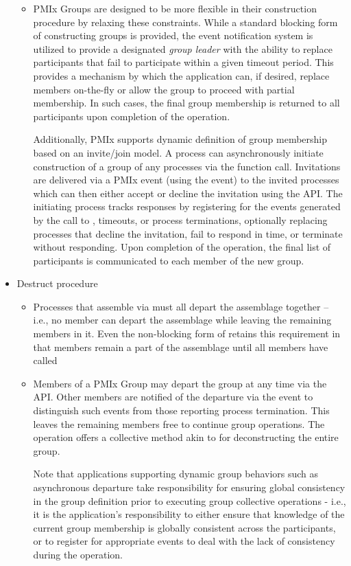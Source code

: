 \begin{itemize}
\begin{itemize}
        \item \ac{PMIx} Groups are designed to be more flexible in their construction procedure by relaxing these constraints. While a standard blocking form of constructing groups is provided, the event notification system is utilized to provide a designated \emph{group leader} with the ability to replace participants that fail to participate within a given timeout period. This provides a mechanism by which the application can, if desired, replace members on-the-fly or allow the group to proceed with partial membership. In such cases, the final group membership is returned to all participants upon completion of the operation.

        Additionally, \ac{PMIx} supports dynamic definition of group membership based on an invite/join model. A process can asynchronously initiate construction of a group of any processes via the  function call. Invitations are delivered via a \ac{PMIx} event (using the  event) to the invited processes which can then either accept or decline the invitation using the  \ac{API}. The initiating process tracks responses by registering for the events generated by the call to , timeouts, or process terminations, optionally replacing processes that decline the invitation, fail to respond in time, or terminate without responding. Upon completion of the operation, the final list of participants is communicated to each member of the new group.
    \end{itemize}
    \item Destruct procedure
    \begin{itemize}
        \item Processes that assemble via  must all depart the assemblage together – i.e., no member can depart the assemblage while leaving the remaining members in it. Even the non-blocking form of  retains this requirement in that members remain a part of the assemblage until all members have called 
        \item Members of a \ac{PMIx} Group may depart the group at any time via the  \ac{API}. Other members are notified of the departure via the  event to distinguish such events from those reporting process termination. This leaves the remaining members free to continue group operations. The  operation offers a collective method akin to  for deconstructing the entire group.

        Note that applications supporting dynamic group behaviors such as asynchronous departure take responsibility for ensuring global consistency in the group definition prior to executing group collective operations - i.e., it is the application's responsibility to either ensure that knowledge of the current group membership is globally consistent across the participants, or to register for appropriate events to deal with the lack of consistency during the operation.
    \end{itemize}
\end{itemize}

